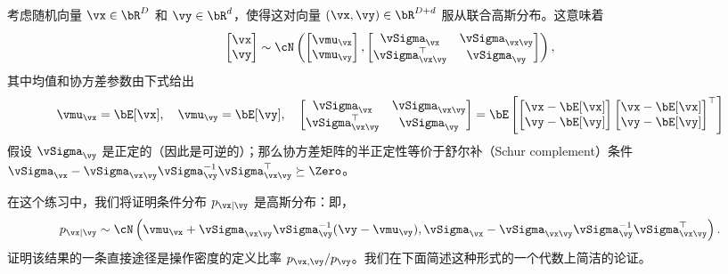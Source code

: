 \documentclass[../../book-main_zh.tex]{subfiles}
\begin{document}
\begin{exercise}\label{exercise:conditional_gaussian}
    考虑随机向量 $\vx \in \bR^D$ 和 $\vy \in \bR^d$，使得这对向量 $(\vx, \vy) \in \bR^{D + d}$ 服从联合高斯分布。这意味着
    \begin{equation*}
        \begin{bmatrix}
            \vx \\
            \vy
        \end{bmatrix}
        \sim
        \cN \left(
            \begin{bmatrix}
                \vmu_{\vx} \\
                \vmu_{\vy}
            \end{bmatrix}
            ,
            \begin{bmatrix}
                \vSigma_{\vx} & \vSigma_{\vx\vy} \\
                \vSigma_{\vx\vy}^\top & \vSigma_{\vy}
            \end{bmatrix}
        \right),
    \end{equation*}
    其中均值和协方差参数由下式给出
    \begin{equation*}
        \vmu_{\vx} = \bE[\vx],\quad \vmu_{\vy} = \bE[\vy],\quad
        \begin{bmatrix}
            \vSigma_{\vx} & \vSigma_{\vx\vy} \\
            \vSigma_{\vx\vy}^\top & \vSigma_{\vy}
        \end{bmatrix}
        =
        \bE\left[
            \begin{bmatrix}
                \vx - \bE[\vx] \\
                \vy - \bE[\vy]
            \end{bmatrix}
            \begin{bmatrix}
                \vx - \bE[\vx] \\
                \vy - \bE[\vy]
            \end{bmatrix}^\top
        \right]
    \end{equation*}
    假设 $\vSigma_{\vy}$ 是正定的（因此是可逆的）；那么协方差矩阵的半正定性等价于舒尔补（Schur complement）条件 $\vSigma_{\vx} - \vSigma_{\vx\vy} \vSigma_{\vy}^{-1} \vSigma_{\vx\vy}^\top \succeq \Zero$。

    在这个练习中，我们将证明条件分布 $p_{\vx \mid \vy}$ 是高斯分布：即，
    \begin{equation}\label{eq:gaussian-conditional-eqn}
        p_{\vx \mid \vy} \sim \cN\left(
            \vmu_{\vx} + \vSigma_{\vx\vy} \vSigma_{\vy}^{-1} (\vy
            - \vmu_{\vy}),
            \vSigma_{\vx} - \vSigma_{\vx\vy} \vSigma_{\vy}^{-1}
            \vSigma_{\vx\vy}^{\top}
        \right).
    \end{equation}
    证明该结果的一条直接途径是操作密度的定义比率 $p_{\vx, \vy} / p_{\vy}$。我们在下面简述这种形式的一个代数上简洁的论证。


\end{exercise}
\end{document}

